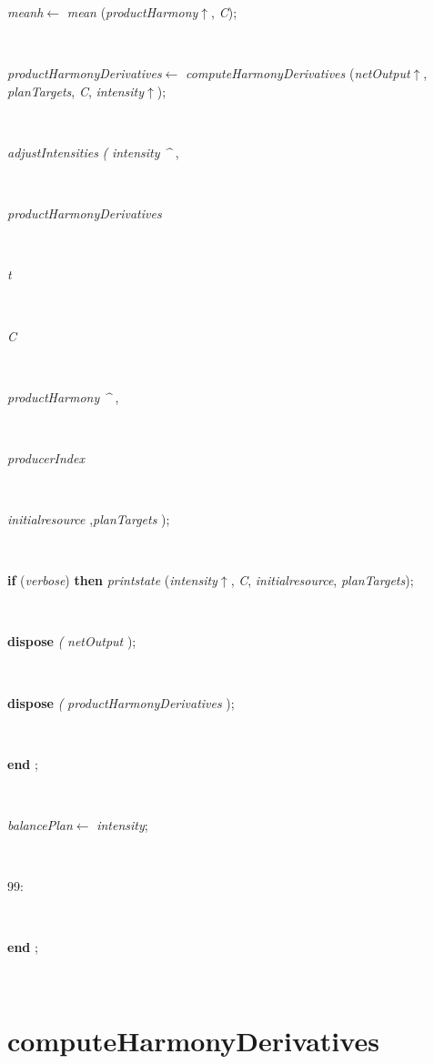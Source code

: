 \begin{tabbing}
\parbox{14cm}{\textsf{\textit{meanh}$\leftarrow$ \textit{mean} (\textit{productHarmony}$\uparrow$\textit{}, \textit{C})}; }\\
\parbox{14cm}{\textsf{\textit{productHarmonyDerivatives}$\leftarrow$ \textit{computeHarmonyDerivatives} (\textit{netOutput}$\uparrow$\textit{}, \textit{planTargets}, \textit{C}, \textit{intensity}$\uparrow$\textit{})}; }\\
\parbox{14cm}{\textsf{\textit{adjustIntensities} \textit{(} \textit{intensity} \textit{\^{}} ,}}\\
\parbox{14cm}{\textsf{\textit{productHarmonyDerivatives}}}\\
\parbox{14cm}{\textsf{\textit{t}}}\\
\parbox{14cm}{\textsf{\textit{C}}}\\
\parbox{14cm}{\textsf{\textit{productHarmony} \textit{\^{}} ,}}\\
\parbox{14cm}{\textsf{\textit{producerIndex}}}\\
\parbox{14cm}{\textsf{\textit{initialresource} ,\textit{planTargets} );}}\\
\parbox{14cm}{\textsf {\textbf {if } \textsf{(\textit{verbose})} \textbf{ then } \textsf{\textit{printstate} (\textit{intensity}$\uparrow$\textit{}, \textit{C}, \textit{initialresource}, \textit{planTargets})}; }}\\
\parbox{14cm}{\textsf{\textbf{dispose} \textit{(} \textit{netOutput} );}}\\
\parbox{14cm}{\textsf{\textbf{dispose} \textit{(} \textit{productHarmonyDerivatives} );}}\\
\<\-\parbox{14cm}{\textsf{\textbf{end} ;}}\\
\parbox{14cm}{\textsf{\textit{balancePlan}$\leftarrow$ \textit{intensity}}; }\\
\parbox{14cm}{\textsf{99:}}\\
\<\-\parbox{14cm}{\textsf{\textbf{end} ;}}\\
\end{tabbing}
\section{computeHarmonyDerivatives}\label{sec:harmonycomputeHarmonyDerivatives}

